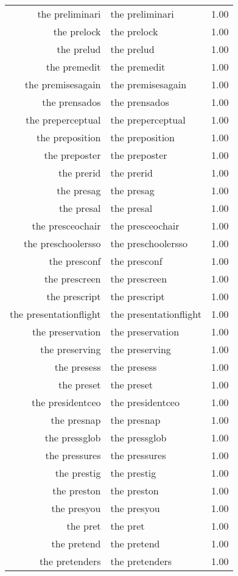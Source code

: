 \begin{table}[ht]
\begin{tabular}{rlr}
  the preliminari & the preliminari & 1.00 \\ 
  the prelock & the prelock & 1.00 \\ 
  the prelud & the prelud & 1.00 \\ 
  the premedit & the premedit & 1.00 \\ 
  the premisesagain & the premisesagain & 1.00 \\ 
  the prensados & the prensados & 1.00 \\ 
  the preperceptual & the preperceptual & 1.00 \\ 
  the preposition & the preposition & 1.00 \\ 
  the preposter & the preposter & 1.00 \\ 
  the prerid & the prerid & 1.00 \\ 
  the presag & the presag & 1.00 \\ 
  the presal & the presal & 1.00 \\ 
  the presceochair & the presceochair & 1.00 \\ 
  the preschoolersso & the preschoolersso & 1.00 \\ 
  the presconf & the presconf & 1.00 \\ 
  the prescreen & the prescreen & 1.00 \\ 
  the prescript & the prescript & 1.00 \\ 
  the presentationflight & the presentationflight & 1.00 \\ 
  the preservation & the preservation & 1.00 \\ 
  the preserving & the preserving & 1.00 \\ 
  the presess & the presess & 1.00 \\ 
  the preset & the preset & 1.00 \\ 
  the presidentceo & the presidentceo & 1.00 \\ 
  the presnap & the presnap & 1.00 \\ 
  the pressglob & the pressglob & 1.00 \\ 
  the pressures & the pressures & 1.00 \\ 
  the prestig & the prestig & 1.00 \\ 
  the preston & the preston & 1.00 \\ 
  the presyou & the presyou & 1.00 \\ 
  the pret & the pret & 1.00 \\ 
  the pretend & the pretend & 1.00 \\ 
  the pretenders & the pretenders & 1.00 \\ 

\end{tabular}
\end{table}
